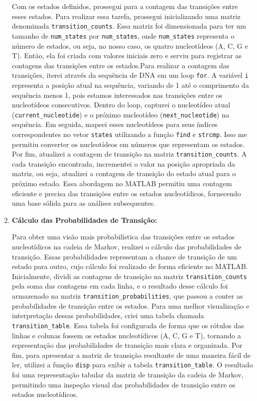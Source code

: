 \documentclass{article}
\begin{document}
\begin{enumerate}
    Com os estados definidos, prossegui para a contagem das transições entre esses estados. Para realizar essa tarefa, prossegui inicializando uma matriz denominada \texttt{transition\_counts}. Essa matriz foi dimensionada para ter um tamanho de \texttt{num\_states} por \texttt{num\_states}, onde \texttt{num\_states} representa o número de estados, ou seja, no nosso caso, os quatro nucleotídeos (A, C, G e T). Então, ela foi criada com valores iniciais zero e serviu para registrar as contagens das transições entre os estados.Para realizar a contagem das transições, iterei através da sequência de DNA em um loop \texttt{for}. A variável \texttt{i} representa a posição atual na sequência, variando de 1 até o comprimento da sequência menos 1, pois estamos interessados nas transições entre os nucleotídeos consecutivos. Dentro do loop, capturei o nucleotídeo atual (\texttt{current\_nucleotide}) e o próximo nucleotídeo (\texttt{next\_nucleotide}) na sequência. Em seguida, mapeei esses nucleotídeos para seus índices correspondentes no vetor \texttt{states} utilizando a função \texttt{find} e \texttt{strcmp}. Isso me permitiu converter os nucleotídeos em números que representam os estados. Por fim, atualizei a contagem de transição na matriz \texttt{transition\_counts}. A cada transição encontrada, incrementei o valor na posição apropriada da matriz, ou seja, atualizei a contagem de transição do estado atual para o próximo estado. Essa abordagem no MATLAB permitiu uma contagem eficiente e precisa das transições entre os estados nucleotídicos, fornecendo uma base sólida para as análises subsequentes.


    \item \textbf{Cálculo das Probabilidades de Transição:}
    
    Para obter uma visão mais probabilística das transições entre os estados nucleotídicos na cadeia de Markov, realizei o cálculo das probabilidades de transição. Essas probabilidades representam a chance de transição de um estado para outro, cujo cálculo foi realizado de forma eficiente no MATLAB. Inicialmente, dividi as contagens de transição na matriz \texttt{transition\_counts} pela soma das contagens em cada linha, e o resultado desse cálculo foi armazenado na matriz \texttt{transition\_probabilities}, que passou a conter as probabilidades de transição entre os estados. Para uma melhor visualização e interpretação dessas probabilidades, criei uma tabela chamada \texttt{transition\_table}. Essa tabela foi configurada de forma que os rótulos das linhas e colunas fossem os estados nucleotídicos (A, C, G e T), tornando a representação das probabilidades de transição mais clara e organizada. Por fim, para apresentar a matriz de transição resultante de uma maneira fácil de ler, utilizei a função \texttt{disp} para exibir a tabela \texttt{transition\_table}. O resultado foi uma representação tabular da matriz de transição da cadeia de Markov, permitindo uma inspeção visual das probabilidades de transição entre os estados nucleotídicos.



\end{enumerate}
\end{document}
